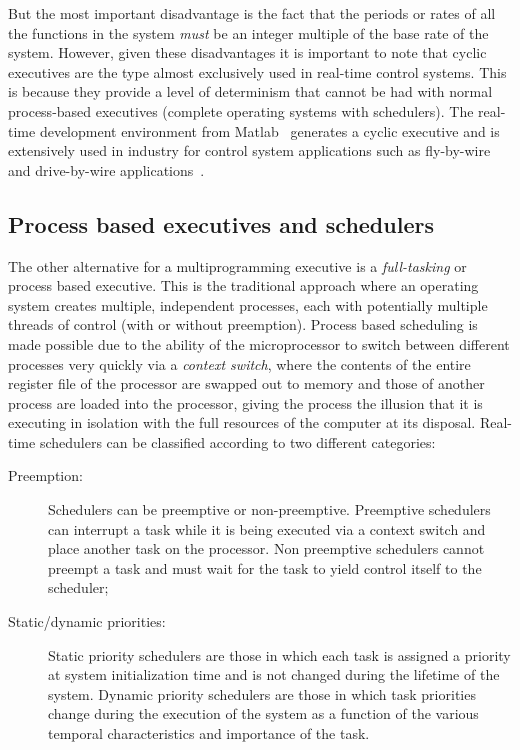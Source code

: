 But the most important disadvantage is the fact that the periods or
rates of all the functions in the system \emph{must} be an integer
multiple of the base rate of the system. However, given these
disadvantages it is important to note that cyclic executives are the
type almost exclusively used in real-time control systems. This is
because they provide a level of determinism that cannot be had with
normal process-based executives (complete operating systems with
schedulers). The \simu real-time development environment from
Matlab~\cite{simulink} generates a cyclic executive and is extensively
used in industry for control system applications such as fly-by-wire
and drive-by-wire applications~\cite{bishop-ctrl}.

\subsection{Process based executives and schedulers}
\label{sec:process_based}
The other alternative for a multiprogramming executive is a
\emph{full-tasking} or process based executive. This is the
traditional approach where an operating system creates multiple,
independent processes, each with potentially multiple threads of
control (with or without preemption). Process based scheduling is made
possible due to the ability of the microprocessor to switch between
different processes very quickly via a \emph{context switch}, where
the contents of the entire register file of the processor are swapped
out to memory and those of another process are loaded into the
processor, giving the process the illusion that it is executing in
isolation with the full resources of the computer at its
disposal. Real-time schedulers can be classified according to two
different categories:

\begin{description}
\item[Preemption:]{Schedulers can be preemptive or
  non-preemptive. Preemptive schedulers can interrupt a task while it
  is being executed via a context switch and place another task on the
  processor. Non preemptive schedulers cannot preempt a task and must
  wait for the task to yield control itself to the scheduler;}
\item[Static/dynamic priorities:]{Static priority schedulers are those
  in which each task is assigned a priority at system initialization
  time and is not changed during the lifetime of the system. Dynamic
  priority schedulers are those in which task priorities change during
  the execution of the system as a function of the various temporal
  characteristics and importance of the task.}
\end{description}

